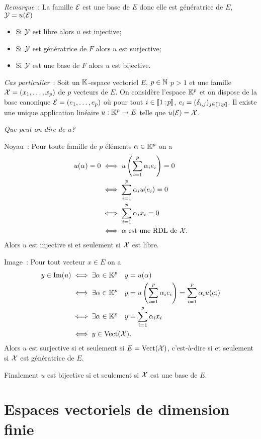 \emph{Remarque}~: La famille \(\mathcal{E}\) est une base de \(E\) donc elle est 
génératrice de \(E\), \(\mathcal{Y}=u(\mathcal{E})\)
\begin{itemize}
  \item Si \(\mathcal{Y}\) est libre alors \(u\) est injective;
  \item Si \(\mathcal{Y}\) est génératrice de \(F\) alors \(u\) est surjective;
  \item Si \(\mathcal{Y}\) est une base de \(F\) alors \(u\) est bijective.
\end{itemize}

\emph{Cas particulier}~: Soit un \(\mathbb{K}\)-espace vectoriel \(E\), \(p \in \mathbb{N}\) 
\(p>1\) et une famille \(\mathcal{X}=(x_1, \ldots, x_p)\) de \(p\) vecteurs de \(E\). On 
considère l'espace \(\mathbb{K}^p\) et on dispose de la base canonique \(\mathcal{E}=(e_1, 
\ldots, e_p)\) où pour tout \(i \in \mathopen{\llbracket}1\mathclose{}\mathpunct{};p\mathclose{\rrbracket}\), \(e_i = 
(\delta_{i,j})_{j \in \mathopen{\llbracket}1\mathclose{}\mathpunct{};p\mathclose{\rrbracket}}\). Il existe une unique 
application linéaire \(u : \mathbb{K}^p \rightarrow E\) telle que \(u(\mathcal{E})=\mathcal{X}\).

\emph{Que peut on dire de \(u\)?}

Noyau~: Pour toute famille de \(p\) éléments \(\alpha \in \mathbb{K}^p\) on a
\begin{align}
  u(\alpha)=0 &\iff u\left(\sum_{i=1}^p \alpha_i e_i \right)=0\\
  &\iff \sum_{i=1}^p \alpha_i u(e_i) =0\\
  &\iff \sum_{i=1}^p \alpha_i x_i =0\\
  &\iff \alpha \text{~est une RDL de } \mathcal{X}.
\end{align}
Alors \(u\) est injective si et seulement si \(\mathcal{X}\) est libre.

Image~: Pour tout vecteur \(x \in E\) on a
\begin{align}
  y \in \operatorname{Im}(u) &\iff \exists \alpha \in \mathbb{K}^p \quad y=u(\alpha)\\
  &\iff \exists \alpha \in \mathbb{K}^p \quad y=u\left(\sum_{i=1}^p \alpha_i e_i 
  \right)= \sum_{i=1}^p \alpha_i u(e_i) \\
  &\iff \exists \alpha \in \mathbb{K}^p \quad y=\sum_{i=1}^p \alpha_i x_i\\
  &\iff y \in \operatorname{Vect}(\mathcal{X}).
\end{align}
Alors \(u\) est surjective si et seulement si \(E=\operatorname{Vect}(\mathcal{X})\), 
c'est-à-dire si et seulement si \(\mathcal{X}\) est génératrice de \(E\).

Finalement \(u\) est bijective si et seulement si \(\mathcal{X}\) est une base de \(E\).

\section{Espaces vectoriels de dimension finie}

